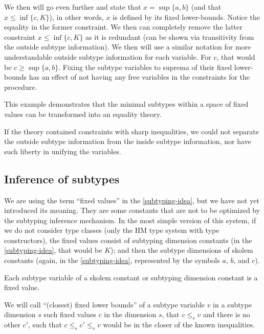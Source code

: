 We then will go even further and state that $x = \sup \{a, b\}$ (and that $x \leq \inf \{c, K\}$), in other words, $x$ is defined by its fixed lower-bounds. Notice the equality in the former constraint. We then can completely remove the latter constraint $x \leq \inf \{c, K\}$ as it is redundant (can be shown via transitivity from the outside subtype information).  We then will use a similar notation for more understandable outside subtype information for each variable. For $c$, that would be $c \geq \sup \{a, b\}$. Fixing the subtype variables to suprema of their fixed lower-bounds has an effect of not having any free variables in the constraints for the procedure.

This example demonstrates that the minimal subtypes within a space of fixed values can be transformed into an equality theory.

\begin{remark}
    If the theory contained constraints with sharp inequalities, we could not separate the outside subtype information from the inside subtype information, nor have such liberty in unifying the variables.
\end{remark}

\subsection{Inference of subtypes}

We are using the term ``fixed values'' in the \cref{subtyping-idea}, but we have not yet introduced its meaning. They are some constants that are not to be optimized by the subtyping inference mechanism. In the most simple version of this system, if we do not consider type classes (only the HM type system with type constructors), the fixed values consist of subtyping dimension constants (in the \cref{subtyping-idea}, that would be $K$); and then the subtype dimensions of skolem constants (again, in the \cref{subtyping-idea}, represented by the symbols $a$, $b$, and $c$).

\begin{defn}
    Each subtype variable of a skolem constant or subtyping dimension constant is a fixed value.
\end{defn}

\begin{defn}
    We will call ``(closest) fixed lower bounds'' of a subtype variable $v$ in a subtype dimension $s$ such fixed values $c$ in the dimension $s$, that $c \leq_s v$ and there is no other $c'$, such that $c \leq_s c' \leq_s v$ would be in the closer of the known inequalities.
\end{defn}

